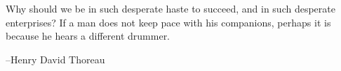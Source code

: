 \documentclass[fleqn,addpoints]{exam}
\begin{document}
\fi

\ifprintanswers
\else
\vspace{2.5 in}

\begin{em}
Why should we be in such desperate haste to succeed, and in such desperate enterprises? If a man does not keep pace with
his companions, perhaps it is because he hears a different drummer. 

\end{em}

\vspace{0.1 in}
\hspace{0.5 in} --Henry David Thoreau

\fi
\end{document}
